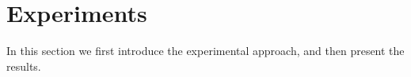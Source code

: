 \documentclass[conference]{IEEEtran}
\begin{document}
\fi















\section{Experiments}\label{sec:exp}

In this section we first introduce the experimental approach, and then 
present the results.  

\iffalse
\begin{figure}[t]
\begin{minipage}[b]{0.45\linewidth}
\centering
\texttt{[image: Qformulas]}
\caption{Experimental results on Q pattern formulas ().}
\label{fig:Qformulas}
\vspace{0.3cm}
\end{minipage}
\hspace{0.6cm}
\begin{minipage}[b]{0.45\linewidth}
\centering
\texttt{[image: O2formulas]}
\caption{Experimental results on O2 pattern formulas ().}
\label{fig:O2formulas}

\end{minipage}
\end{figure}
\fi
\end{document}
